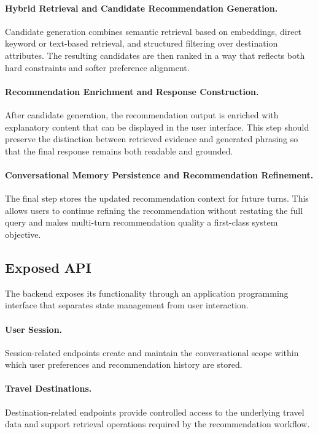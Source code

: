 \paragraph{Hybrid Retrieval and Candidate Recommendation Generation.}
Candidate generation combines semantic retrieval based on embeddings, direct keyword or text-based retrieval, and structured filtering over destination attributes. The resulting candidates are then ranked in a way that reflects both hard constraints and softer preference alignment.

\paragraph{Recommendation Enrichment and Response Construction.}
After candidate generation, the recommendation output is enriched with explanatory content that can be displayed in the user interface. This step should preserve the distinction between retrieved evidence and generated phrasing so that the final response remains both readable and grounded.

\paragraph{Conversational Memory Persistence and Recommendation Refinement.}
The final step stores the updated recommendation context for future turns. This allows users to continue refining the recommendation without restating the full query and makes multi-turn recommendation quality a first-class system objective.

\subsection{Exposed API}\label{subsection:system-architecture:api}
The backend exposes its functionality through an application programming interface that separates state management from user interaction.

\paragraph{User Session.}
Session-related endpoints create and maintain the conversational scope within which user preferences and recommendation history are stored.

\paragraph{Travel Destinations.}
Destination-related endpoints provide controlled access to the underlying travel data and support retrieval operations required by the recommendation workflow.

